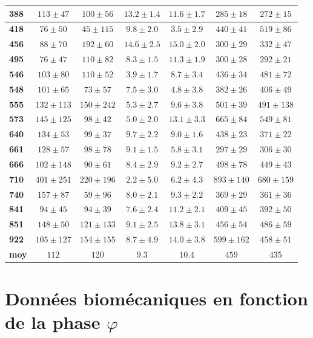 \begin{appendices}
\begin{tabular}{|l|c|c|c|c|c|c|}
		\textbf{388}&$113 \pm 47$&$100 \pm 56$&$13.2 \pm 1.4$&$11.6 \pm 1.7$&$285 \pm 18$&$272 \pm 15$\\\hline
		\textbf{418}&$76 \pm 50$&$45 \pm 115$&$9.8 \pm 2.0$&$3.5 \pm 2.9$&$440 \pm 41$&$519 \pm 86$\\\hline
		\textbf{456}&$88 \pm 70$&$192 \pm 60$&$14.6 \pm 2.5$&$15.0 \pm 2.0$&$300 \pm 29$&$332 \pm 47$\\\hline
		\textbf{495}&$76 \pm 47$&$110 \pm 82$&$8.3 \pm 1.5$&$11.3 \pm 1.9$&$300 \pm 28$&$292 \pm 21$\\\hline
		\textbf{546}&$103 \pm 80$&$110 \pm 52$&$3.9 \pm 1.7$&$8.7 \pm 3.4$&$436 \pm 34$&$481 \pm 72$\\\hline
		\textbf{548}&$101 \pm 65$&$73 \pm 57$&$7.5 \pm 3.0$&$4.8 \pm 3.8$&$382 \pm 26$&$406 \pm 49$\\\hline
		\textbf{555}&$132 \pm 113$&$150 \pm 242$&$5.3 \pm 2.7$&$9.6 \pm 3.8$&$501 \pm 39$&$491 \pm 138$\\\hline
		\textbf{573}&$145 \pm 125$&$98 \pm 42$&$5.0 \pm 2.0$&$13.1 \pm 3.3$&$665 \pm 84$&$549 \pm 81$\\\hline
		\textbf{640}&$134 \pm 53$&$99 \pm 37$&$9.7 \pm 2.2$&$9.0 \pm 1.6$&$438 \pm 23$&$371 \pm 22$\\\hline
		\textbf{661}&$128 \pm 57$&$98 \pm 78$&$9.1 \pm 1.5$&$5.8 \pm 3.1$&$297 \pm 29$&$306 \pm 30$\\\hline
		\textbf{666}&$102 \pm 148$&$90 \pm 61$&$8.4 \pm 2.9$&$9.2 \pm 2.7$&$498 \pm 78$&$449 \pm 43$\\\hline
		\textbf{710}&$401 \pm 251$&$220 \pm 196$&$2.2 \pm 5.0$&$6.2 \pm 4.3$&$893 \pm 140$&$680 \pm 159$\\\hline
		\textbf{740}&$157 \pm 87$&$59 \pm 96$&$8.0 \pm 2.1$&$9.3 \pm 2.2$&$369 \pm 29$&$361 \pm 36$\\\hline
		\textbf{841}&$94 \pm 45$&$94 \pm 39$&$7.6 \pm 2.4$&$11.2 \pm 2.1$&$409 \pm 45$&$392 \pm 50$\\\hline
		\textbf{851}&$148 \pm 50$&$121 \pm 133$&$9.1 \pm 2.5$&$13.8 \pm 3.1$&$456 \pm 54$&$486 \pm 59$\\\hline
		\textbf{922}&$105 \pm 127$&$154 \pm 155$&$8.7 \pm 4.9$&$14.0 \pm 3.8$&$599 \pm 162$&$458 \pm 51$\\\hline
		\textbf{moy}&$112$&$120$&$9.3$&$10.4$&$459$&$435$\\\hline
	\end{tabular}

	\chapter{Données biomécaniques en fonction de la phase $\varphi$} \label{app_param_against_phase}
	

\end{appendices}
